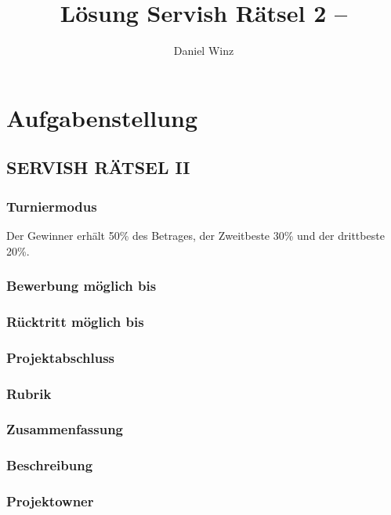 \documentclass[10pt, fleqn]{article}
\title{Lösung Servish Rätsel 2 -- }
\author{Daniel Winz}
\begin{document}
\vfill
\maketitle
\vfill
\tableofcontents
\vfill
\newpage

\section{Aufgabenstellung}

\subsection*{SERVISH RÄTSEL II}

\subsubsection*{Turniermodus}
Der Gewinner erhält 50\% des Betrages, der Zweitbeste 30\% und der drittbeste 20\%. 

\subsubsection*{Bewerbung möglich bis}

\subsubsection*{Rücktritt möglich bis}

\subsubsection*{Projektabschluss}

\subsubsection*{Rubrik}

\subsubsection*{Zusammenfassung}

\subsubsection*{Beschreibung}

\subsubsection*{Projektowner}
\end{document}
